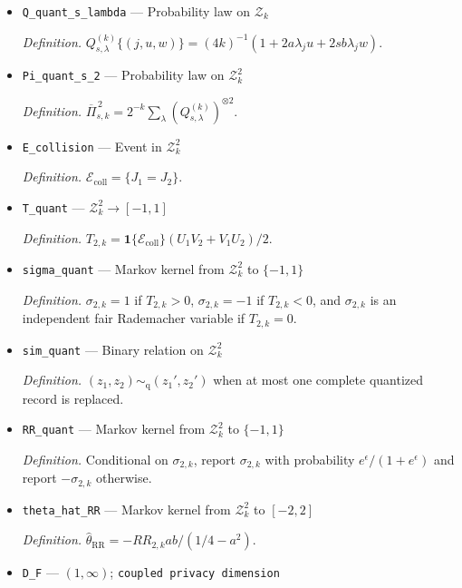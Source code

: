 \documentclass{article}
\begin{document}
\begin{itemize}
  \item \texttt{Q\_\allowbreak{}quant\_\allowbreak{}s\_\allowbreak{}lambda} --- Probability law on \(\mathcal Z_k\)
  \par\smallskip\noindent\emph{Definition.} \(Q_{s,\lambda}^{(k)}\{(j,u,w)\}=(4k)^{-1}(1+2a\lambda_ju+2sb\lambda_jw)\).
  \item \texttt{Pi\_\allowbreak{}quant\_\allowbreak{}s\_\allowbreak{}2} --- Probability law on \(\mathcal Z_k^2\)
  \par\smallskip\noindent\emph{Definition.} \(\overline\Pi_{s,k}^{\,2}=2^{-k}\sum_\lambda(Q_{s,\lambda}^{(k)})^{\otimes2}\).
  \item \texttt{E\_\allowbreak{}collision} --- Event in \(\mathcal Z_k^2\)
  \par\smallskip\noindent\emph{Definition.} \(\mathcal E_{\mathrm{coll}}=\{J_1=J_2\}\).
  \item \texttt{T\_\allowbreak{}quant} --- \(\mathcal Z_k^2\to[-1,1]\)
  \par\smallskip\noindent\emph{Definition.} \(T_{2,k}=\mathbf 1\{\mathcal E_{\mathrm{coll}}\}(U_1V_2+V_1U_2)/2\).
  \item \texttt{sigma\_\allowbreak{}quant} --- Markov kernel from \(\mathcal Z_k^2\) to \(\{-1,1\}\)
  \par\smallskip\noindent\emph{Definition.} \(\sigma_{2,k}=1\) if \(T_{2,k}>0\), \(\sigma_{2,k}=-1\) if \(T_{2,k}<0\), and \(\sigma_{2,k}\) is an independent fair Rademacher variable if \(T_{2,k}=0\).
  \item \texttt{sim\_\allowbreak{}quant} --- Binary relation on \(\mathcal Z_k^2\)
  \par\smallskip\noindent\emph{Definition.} \((z_1,z_2)\sim_{\mathrm q}(z_1',z_2')\) when at most one complete quantized record is replaced.
  \item \texttt{RR\_\allowbreak{}quant} --- Markov kernel from \(\mathcal Z_k^2\) to \(\{-1,1\}\)
  \par\smallskip\noindent\emph{Definition.} Conditional on \(\sigma_{2,k}\), report \(\sigma_{2,k}\) with probability \(e^\epsilon/(1+e^\epsilon)\) and report \(-\sigma_{2,k}\) otherwise.
  \item \texttt{theta\_\allowbreak{}hat\_\allowbreak{}RR} --- Markov kernel from \(\mathcal Z_k^2\) to \([-2,2]\)
  \par\smallskip\noindent\emph{Definition.} \(\widehat\theta_{\mathrm{RR}}=-RR_{2,k}ab/(1/4-a^2)\).
  \item \texttt{D\_\allowbreak{}F} --- \((1,\infty)\); \texttt{coupled privacy dimension}

\end{itemize}
\end{document}
